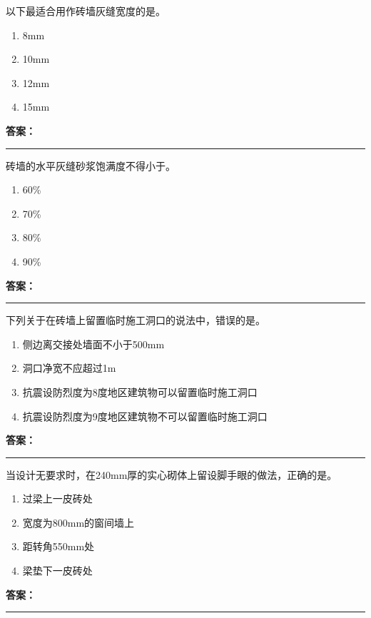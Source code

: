 \documentclass[UTF8,fontset=fandol,11pt]{ctexart}
\newcommand{\answerline}{\textcolor{answerred}{\rule{2.4cm}{0.7pt}}}
\begin{document}
\begin{quizbox}[title={第 16 题}]
以下最适合用作砖墙灰缝宽度的是。\\
\begin{enumerate}[label=\Alph*.]
\item 8mm
\item 10mm
\item 12mm
\item 15mm
\end{enumerate}
\textbf{\textcolor{answerred}{答案：}} \answerline
\end{quizbox}

\begin{quizbox}[title={第 17 题}]
砖墙的水平灰缝砂浆饱满度不得小于。\\
\begin{enumerate}[label=\Alph*.]
\item 60\%
\item 70\%
\item 80\%
\item 90\%
\end{enumerate}
\textbf{\textcolor{answerred}{答案：}} \answerline
\end{quizbox}

\begin{quizbox}[title={第 18 题}]
下列关于在砖墙上留置临时施工洞口的说法中，错误的是。\\
\begin{enumerate}[label=\Alph*.]
\item 侧边离交接处墙面不小于500mm
\item 洞口净宽不应超过1m
\item 抗震设防烈度为8度地区建筑物可以留置临时施工洞口
\item 抗震设防烈度为9度地区建筑物不可以留置临时施工洞口
\end{enumerate}
\textbf{\textcolor{answerred}{答案：}} \answerline
\end{quizbox}

\begin{quizbox}[title={第 19 题}]
当设计无要求时，在240mm厚的实心砌体上留设脚手眼的做法，正确的是。\\
\begin{enumerate}[label=\Alph*.]
\item 过梁上一皮砖处
\item 宽度为800mm的窗间墙上
\item 距转角550mm处
\item 梁垫下一皮砖处
\end{enumerate}
\textbf{\textcolor{answerred}{答案：}} \answerline
\end{quizbox}
\end{document}
